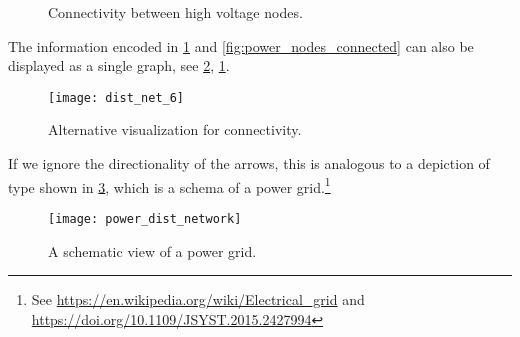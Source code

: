 \begin{figure}[h!]
    \centering
    \caption{Connectivity between high voltage nodes.}
    \label{fig:power_internodal}
\end{figure}
The information encoded in \cref{fig:power_internodal} and \cref{fig:power_nodes_connected} can also be displayed as a single graph, see \cref{fig:power_graph},
\cref{fig:power_internodal}.
\begin{figure}[h!]
    \centering
    \texttt{[image: dist\_net\_6]}
    \caption{Alternative visualization for connectivity.}
    \label{fig:power_graph}
\end{figure}
If we ignore the directionality of the arrows, this is analogous to a depiction of type shown in \cref{fig:power_schema}, which is a schema of a power grid.\footnote{See \url{https://en.wikipedia.org/wiki/Electrical_grid} and \url{https://doi.org/10.1109/JSYST.2015.2427994}}

\begin{figure}[h!]
    \centering
    \texttt{[image: power\_dist\_network]}
    \caption{A schematic view of a power grid.}
    \label{fig:power_schema}
\end{figure}
